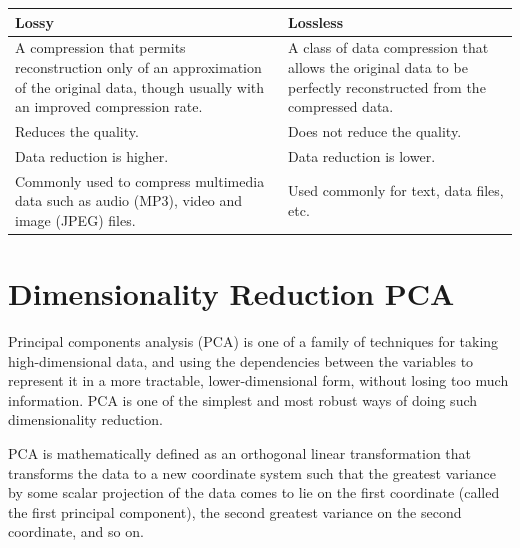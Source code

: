 \begingroup
\centering
    \begin{tabular}{ | p{7cm} | p{7cm} | }
    \hline
    Lossy & Lossless \\ \hline
    A compression
    that permits reconstruction only of an approximation of the original data, though usually with an improved compression rate. & A class of data compression that allows the original data to be perfectly reconstructed from the compressed data. \\ \hline
    Reduces the quality. & Does not reduce the quality. \\ \hline
    Data reduction is higher. & Data reduction is lower. \\ \hline
    Commonly used to compress multimedia data such as audio (MP3), video and image (JPEG) files. & Used commonly for text, data files, etc. \\
    \hline
    \end{tabular}
\label{tbl:lossyvslossless}
\endgroup


\section{Dimensionality Reduction PCA}

Principal components analysis (PCA) is one of a family of techniques for taking high-dimensional data, and using the dependencies between the variables to represent it in a more tractable, lower-dimensional form, without losing too much information. PCA is one of the simplest and most robust ways of doing such dimensionality reduction.

PCA is mathematically defined as an orthogonal linear transformation that transforms the data to a new coordinate system such that the greatest variance by some scalar projection of the data comes to lie on the first coordinate (called the first principal component), the second greatest variance on the second coordinate, and so on.


